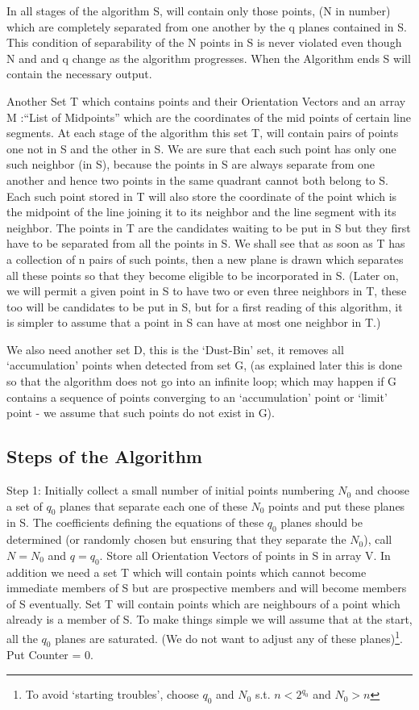 \documentclass[english]{article}
\begin{document}
In all stages of the algorithm
S, will contain only those points, (N in number) which are completely
separated from one another by the q planes contained in S. This condition
of separability of the N points in S is never violated even though
N and and q change as the algorithm progresses. When the Algorithm
ends S will contain the necessary output.

Another Set T which contains points and their Orientation Vectors
and an array M :{}``List of Midpoints'' which are the coordinates
of the mid points of certain line segments. At each stage of the algorithm
this set T, will contain pairs of points one not in S and the other
in S. We are sure that each such point has only one such neighbor (in S),
because the points in S are always separate from one another and hence
two points in the same quadrant cannot both belong to S. Each such
point stored in T will also store the coordinate of the point which
is the midpoint of the line joining it to its neighbor and the line
segment with its neighbor. The points in T are the candidates waiting
to be put in S but they first have to be separated from all the points
in S. We shall see that as soon as T has a collection of n pairs of
such points, then a new plane is drawn which separates all these points
so that they become eligible to be incorporated in S. (Later on, we will permit a given point in S to have two or even three neighbors in T, these too will be candidates to be put in S, but for a first reading of this algorithm, it is simpler to assume that a point in S can have at most one neighbor in T.) 

We also need another set D, this is the `Dust-Bin' set, it removes
all `accumulation' points when detected from set G, (as explained
later this is done so that the algorithm does not go into an infinite
loop; which may happen if G contains a sequence of points converging to an `accumulation' point or `limit' point - we assume that such points do not exist in G).

\medskip{}



\subsection{Steps of the Algorithm}

Step 1: Initially collect a small number of initial points numbering
$N_{0}$ and choose a set of $q_{0}$ planes that separate each one
of these $N_{0}$ points and put these planes in S. The coefficients
defining the equations of these $q_{0}$ planes should be determined
(or randomly chosen but ensuring that they separate the $N_{0}$),
call $N=N_{0}$ and $q=q_{0}$. Store all Orientation Vectors of points
in S in array V. In addition we need a set T which will contain points
which cannot become immediate members of S but are prospective members
and will become members of S eventually. Set T will contain points
which are neighbours of a point which already is a member of S. To
make things simple we will assume that at the start, all the $q_{0}$
planes are saturated. (We do not want to adjust any of these planes)\footnote{To avoid `starting troubles', choose $q_{0}$ and $N_{0}$ s.t. $n<2^{q_{0}}$
and $N_{0}>n$}. Put Counter = 0.
\end{document}
